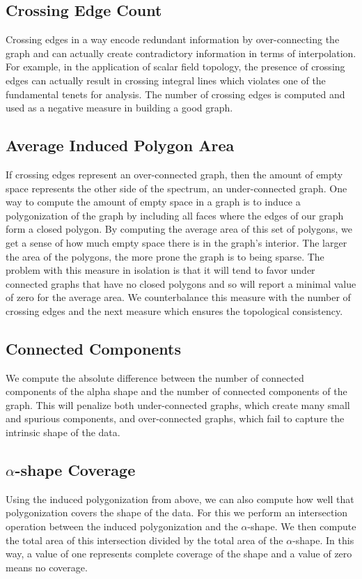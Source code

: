 \subsection{Crossing Edge Count}
%
Crossing edges in a way encode redundant information by over-connecting the graph and can actually create contradictory information in terms of interpolation.
%
For example, in the application of scalar field topology, the presence of crossing edges can actually result in crossing integral lines which violates one of the fundamental tenets for analysis.
%
The number of crossing edges is computed and used as a negative measure in building a good graph.

\subsection{Average Induced Polygon Area}
%
If crossing edges represent an over-connected graph, then the amount of empty space represents the other side of the spectrum, an under-connected graph.
%
One way to compute the amount of empty space in a graph is to induce a polygonization of the graph by including all faces where the edges of our graph form a closed polygon.
%
By computing the average area of this set of polygons, we get a sense of how much empty space there is in the graph's interior.
%
The larger the area of the polygons, the more prone the graph is to being sparse.
%
The problem with this measure in isolation is that it will tend to favor under connected graphs that have no closed polygons and so will report a minimal value of zero for the average area.
%
We counterbalance this measure with the number of crossing edges and the next measure which ensures the topological consistency.

\subsection{Connected Components}
%
We compute the absolute difference between the number of connected components of the alpha shape and the number of connected components of the graph.
%
This will penalize both under-connected graphs, which create many small and spurious components, and over-connected graphs, which fail to capture the intrinsic shape of the data.

\subsection{$\alpha$-shape Coverage}
%
Using the induced polygonization from above, we can also compute how well that polygonization covers the shape of the data.
%
For this we perform an intersection operation between the induced polygonization and the $\alpha$-shape.
%
We then compute the total area of this intersection divided by the total area of the $\alpha$-shape.
%
In this way, a value of one represents complete coverage of the shape and a value of zero means no coverage.

